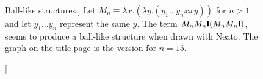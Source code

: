 \begin{figure}[htbp]
{	}
	
	\caption
	[Ball-like structures.]
	{Let $M_n\equiv\lambda x.(\lambda y.(y_1\hdots y_n x x y))$ for $n>1$ and
	let $y_1\hdots y_n$ represent the same $y$. The term
	$M_n M_n\textsf{\textbf{I}}(M_n M_n\textsf{\textbf{I}})$, seems to produce a ball-like structure when drawn 
	with Neato. The graph on the title page is the version for $n=15$.}
	\label{fig:images_Regular6_NEATO}
\end{figure}

